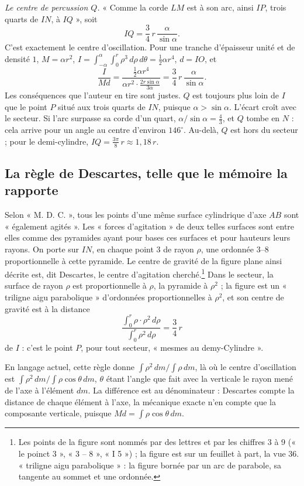 \documentclass[11pt,a4paper]{article}
\begin{document}
\emph{Le centre de percussion \(Q\).} « Comme la corde \(LM\) est à son arc,
ainsi \(IP\), trois quarts de \(IN\), à \(IQ\) », soit
\[
IQ=\frac34\,r\,\frac{\alpha}{\sin\alpha}.
\]
C'est exactement le centre d'oscillation. Pour une tranche d'épaisseur unité et
de densité \(1\), \(M=\alpha r^2\), \(I=\int_{-\alpha}^{\alpha}\int_0^r
\rho^3\,d\rho\,d\theta=\tfrac12\alpha r^4\), \(d=IO\), et
\[
\frac{I}{Md}=\frac{\tfrac12\alpha r^4}{\alpha r^2\cdot\tfrac{2r\sin\alpha}{3\alpha}}
=\frac34\,r\,\frac{\alpha}{\sin\alpha}.
\]
Les conséquences que l'auteur en tire sont justes. \(Q\) est toujours plus loin
de \(I\) que le point \(P\) situé aux trois quarts de \(IN\), puisque
\(\alpha>\sin\alpha\). L'écart croît avec le secteur. Si l'arc surpasse sa corde
d'un quart, \(\alpha/\sin\alpha=\tfrac43\), et \(Q\) tombe en \(N\) : cela
arrive pour un angle au centre d'environ \(146^\circ\). Au-delà, \(Q\) est hors
du secteur ; pour le demi-cylindre, \(IQ=\tfrac{3\pi}{8}\,r\approx1{,}18\,r\).

\subsection*{La règle de Descartes, telle que le mémoire la rapporte}

Selon « M. D. C. », tous les points d'une même surface cylindrique d'axe \(AB\)
sont « également agités ». Les « forces d'agitation » de deux telles surfaces
sont entre elles comme des pyramides ayant pour bases ces surfaces et pour
hauteurs leurs rayons. On porte sur \(IN\), en chaque point \(3\) de rayon
\(\rho\), une ordonnée \(3\text{--}8\) proportionnelle à cette pyramide. Le
centre de gravité de la figure plane ainsi décrite est, dit Descartes, le centre
d'agitation cherché.\footnote{Les points de la figure sont nommés par des
lettres et par les chiffres 3 à 9 (« le poinct 3 », « 3 -- 8 », « I 5 ») ; la
figure est sur un feuillet à part, la vue 36. « triligne aigu parabolique » :
la figure bornée par un arc de parabole, sa tangente au sommet et une
ordonnée.} Dans le secteur, la surface de rayon \(\rho\) est proportionnelle à
\(\rho\), la pyramide à \(\rho^2\) ; la figure est un « triligne aigu
parabolique » d'ordonnées proportionnelles à \(\rho^2\), et son centre de
gravité est à la distance
\[
\frac{\int_0^r\rho\cdot\rho^2\,d\rho}{\int_0^r\rho^2\,d\rho}=\frac34\,r
\]
de \(I\) : c'est le point \(P\), pour tout secteur, « mesmes au demy-Cylindre ».

En langage actuel, cette règle donne \(\int\rho^2\,dm\big/\int\rho\,dm\), là où
le centre d'oscillation est \(\int\rho^2\,dm\big/\int\rho\cos\theta\,dm\),
\(\theta\) étant l'angle que fait avec la verticale le rayon mené de l'axe à
l'élément \(dm\). La différence est au dénominateur : Descartes compte la
distance de chaque élément à l'axe, la mécanique exacte n'en compte que la
composante verticale, puisque \(Md=\int\rho\cos\theta\,dm\).
\end{document}
